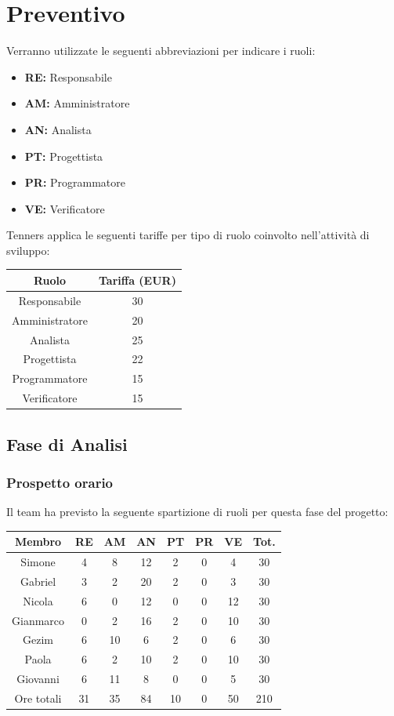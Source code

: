 \section{Preventivo}

Verranno utilizzate le seguenti abbreviazioni per indicare i ruoli:
\begin{itemize}
	\item \textbf{RE:} Responsabile
	\item \textbf{AM:} Amministratore
	\item \textbf{AN:} Analista
	\item \textbf{PT:} Progettista
	\item \textbf{PR:} Programmatore
	\item \textbf{VE:} Verificatore
\end{itemize}

Tenners applica le seguenti tariffe per tipo di ruolo coinvolto nell'attività di sviluppo:
\\
\begin{center}
\begin{tabular}{ |c|c|  }
 \hline
 Ruolo 		& Tariffa (EUR)\\
 \hline\hline
	Responsabile	& 30\\
	Amministratore	& 20\\
	Analista		& 25\\
	Progettista		& 22\\
	Programmatore	& 15\\
	Verificatore	& 15\\
 \hline
\end{tabular}
\end{center}
\newpage
\subsection{Fase di Analisi}
\subsubsection{Prospetto orario}
Il team ha previsto la seguente spartizione di ruoli per questa fase del progetto:
\\
\begin{center}
\begin{tabular}{ |c|c|c|c|c|c|c|c|  }
 \hline
 Membro 		& RE 	& AM 	& AN 	& PT 	& PR 	& VE 	& Tot.\\
 \hline\hline
 Simone			& 4 		& 8		& 12 	& 2 		& 0 		& 4 		& 30\\
 Gabriel		& 3 		& 2 		& 20 	& 2 		& 0 		& 3 		& 30\\
 Nicola			& 6 		& 0 		& 12 	& 0 		& 0 		& 12 	& 30\\
 Gianmarco		& 0 		& 2 		& 16 	& 2 		& 0 		& 10 	& 30\\
 Gezim			& 6 		& 10 	& 6 	& 2 		& 0 		& 6	 	& 30\\
 Paola			& 6 		& 2 		& 10 	& 2 		& 0 		& 10 	& 30\\
 Giovanni		& 6 		& 11 	& 8 	& 0 		& 0 		& 5  	& 30\\
 \hline\hline
 Ore totali		& 31		& 35		& 84 	& 10 	& 0 		& 50 	& 210\\
  \hline
\end{tabular}
\end{center}

